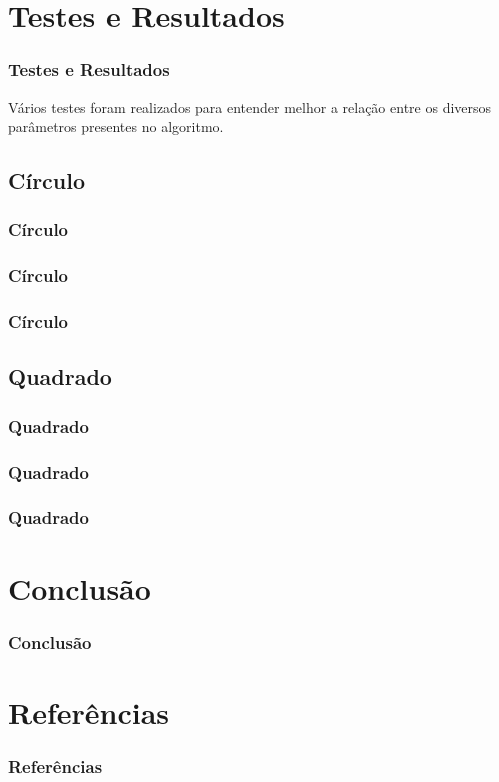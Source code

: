 \documentclass[aspectratio=169]{beamer}
\begin{document}
\section{Testes e Resultados}
\begin{frame}
\frametitle{Testes e Resultados}
Vários testes foram realizados para entender melhor a relação entre os diversos parâmetros presentes no algoritmo.
\end{frame}

\subsection{Círculo}
\begin{frame}
\frametitle{Círculo}
\end{frame}

\begin{frame}
\frametitle{Círculo}
\end{frame}

\begin{frame}
\frametitle{Círculo}
\end{frame}

\subsection{Quadrado}
\begin{frame}
\frametitle{Quadrado}
\end{frame}

\begin{frame}
\frametitle{Quadrado}
\end{frame}

\begin{frame}
\frametitle{Quadrado}
\end{frame}

\section{Conclusão}
\begin{frame}
\frametitle{Conclusão}
\end{frame}

\section{Referências}
\begin{frame}
\frametitle{Referências}
\end{frame}
\end{document}
